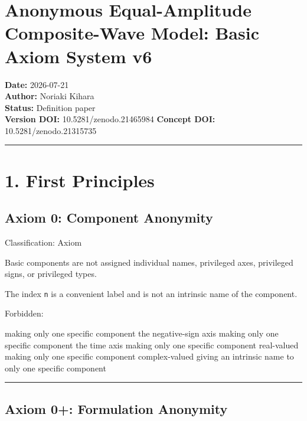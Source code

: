 \documentclass[
  a4paper,
]{article}
\author{}
\date{}
\newenvironment{Shaded}{}{}
\newcommand{\NormalTok}[1]{#1}
\begin{document}
\section{Anonymous Equal-Amplitude Composite-Wave Model: Basic Axiom
System
v6}\label{anonymous-equal-amplitude-composite-wave-model-basic-axiom-system-v6}

\textbf{Date:} 2026-07-21\\
\textbf{Author:} Noriaki Kihara\\
\textbf{Status:} Definition paper\\
\textbf{Version DOI:} 10.5281/zenodo.21465984 \textbf{Concept DOI:}
10.5281/zenodo.21315735

\begin{center}\rule{0.5\linewidth}{0.5pt}\end{center}

\section{1. First Principles}\label{first-principles}

\subsection{Axiom 0: Component
Anonymity}\label{axiom-0-component-anonymity}

Classification: Axiom

Basic components are not assigned individual names, privileged axes,
privileged signs, or privileged types.

The index \texttt{n} is a convenient label and is not an intrinsic name
of the component.

Forbidden:

\begin{Shaded}
\begin{Highlighting}[]
\NormalTok{making only one specific component the negative{-}sign axis}
\NormalTok{making only one specific component the time axis}
\NormalTok{making only one specific component real{-}valued}
\NormalTok{making only one specific component complex{-}valued}
\NormalTok{giving an intrinsic name to only one specific component}
\end{Highlighting}
\end{Shaded}

\begin{center}\rule{0.5\linewidth}{0.5pt}\end{center}

\subsection{Axiom 0+: Formulation
Anonymity}\label{axiom-0-formulation-anonymity}
\end{document}
